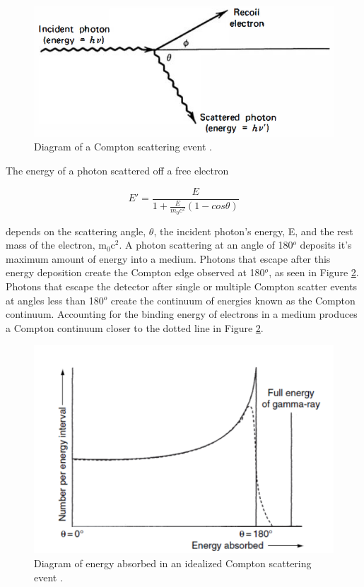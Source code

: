 \begin{figure}[H]
\centering
\includegraphics[width=0.7\linewidth]{images/compton_scatter}
\caption{Diagram of a Compton scattering event \cite{knoll}.}
\label{fig:compton_scatter}
\end{figure}

The energy of a photon scattered off a free electron

\begin{equation} \label{eq:compton_scatter}
E' = \frac{E}{1 + \frac{E}{m_{0} c^2} (1-cos\theta)}
\end{equation}

depends on the scattering angle, $\theta$, the incident photon's energy, E, and the rest mass of the electron, m$_{0}$c$^{2}$. A photon scattering at an angle of 180$^{o}$ deposits it's maximum amount of energy into a medium. Photons that escape after this energy deposition create the Compton edge observed at 180$^{o}$, as seen in Figure \ref{fig:ideal_compton}. Photons that escape the detector after single or multiple Compton scatter events at angles less than 180$^{o}$ create the continuum of energies known as the Compton continuum. Accounting for the binding energy of electrons in a medium produces a Compton continuum closer to the dotted line in Figure \ref{fig:ideal_compton}.

\begin{figure}[H]
\centering
\includegraphics[width=0.75\linewidth]{images/ideal_compton}
\caption{Diagram of energy absorbed in an idealized Compton scattering event \cite{gilmore}.}
\label{fig:ideal_compton}
\end{figure}



